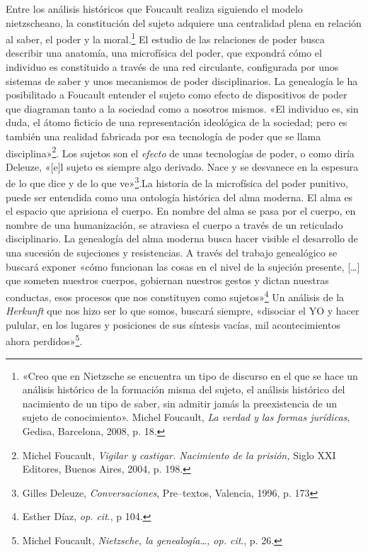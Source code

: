 Entre los análisis históricos que Foucault realiza siguiendo el modelo nietzscheano, la constitución del sujeto adquiere una centralidad plena en relación al saber, el poder y la moral.\footnote{«Creo que en Nietzsche se encuentra un tipo de discurso en el que se hace un análisis histórico de la formación misma del sujeto, el análisis histórico del nacimiento de un tipo de saber, sin admitir jamás la preexistencia de un sujeto de conocimiento». Michel Foucault, \emph{La verdad y las formas jurídicas}, Gedisa, Barcelona, 2008, p. 18.} El estudio de las relaciones de poder busca describir una anatomía, una microfísica del poder, que expondrá cómo el individuo es constituido a través de una red circulante, configurada por unos sistemas de saber y unos mecanismos de poder disciplinarios. La genealogía le ha posibilitado a Foucault entender el sujeto como efecto de dispositivos de poder que diagraman tanto a la sociedad como a nosotros mismos. «El individuo es, sin duda, el átomo ficticio de una representación ideológica de la sociedad; pero es también una realidad fabricada por esa tecnología de poder que se llama disciplina»\footnote{Michel Foucault, \emph{Vigilar y castigar. Nacimiento de la prisión,} Siglo XXI Editores, Buenos Aires, 2004, p. 198.}. Los sujetos son el \emph{efecto} de unas tecnologías de poder, o como diría Deleuze, «{[}e{]}l sujeto es siempre algo derivado. Nace y se desvanece en la espesura de lo que dice y de lo que ve»\footnote{Gilles Deleuze, \emph{Conversaciones}, Pre--textos, Valencia, 1996, p. 173}.La historia de la microfísica del poder punitivo, puede ser entendida como una ontología histórica del alma moderna. El alma es el espacio que aprisiona el cuerpo. En nombre del alma se pasa por el cuerpo, en nombre de una humanización, se atraviesa el cuerpo a través de un reticulado disciplinario. La genealogía del alma moderna busca hacer visible el desarrollo de una sucesión de sujeciones y resistencias. A través del trabajo genealógico se buscará exponer «cómo funcionan las cosas en el nivel de la sujeción presente, {[}\ldots{]} que someten nuestros cuerpos, gobiernan nuestros gestos y dictan nuestras conductas, esos procesos que nos constituyen como sujetos»\footnote{Esther Díaz, \emph{op. cit}., p 104.} Un análisis de la \emph{Herkunft} que nos hizo ser lo que somos, buscará siempre, «disociar el YO y hacer pulular, en los lugares y posiciones de sus síntesis vacías, mil acontecimientos ahora perdidos»\footnote{Michel Foucault, \emph{Nietzsche, la genealogía\ldots, op. cit}., p. 26.}.


